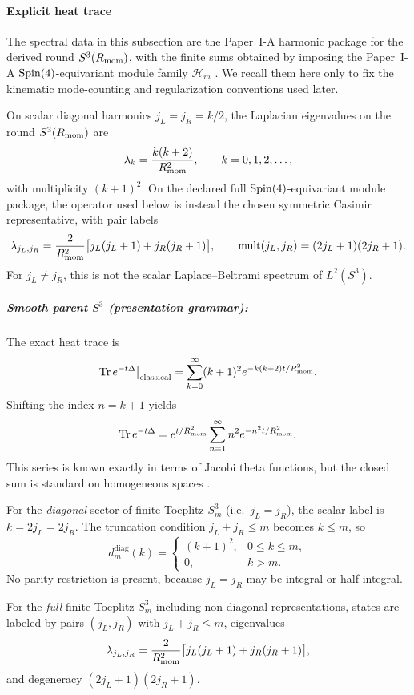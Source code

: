 \documentclass[12pt,a4paper]{article}
\begin{document}
\paragraph{Explicit heat trace}
\label{p2:sec:heat-trace}

The spectral data in this subsection are the Paper~I-A harmonic package for the
derived round \(S^3(R_{\mathrm{mom}})\), with the finite sums obtained by imposing the
Paper~I-A \(\mathrm{Spin}(4)\)-equivariant module family \(\mathcal H_m\)
\cite{Kugelmann2026a}.  We recall them here only to fix the kinematic
mode-counting and regularization conventions used later.

On scalar diagonal harmonics \(j_L=j_R=k/2\), the Laplacian eigenvalues on the round \(S^3(R_{\mathrm{mom}})\) are
\[
\lambda_k=\frac{k(k+2)}{R_{\mathrm{mom}}^2},
\qquad k=0,1,2,\dots,
\]
with multiplicity \((k+1)^2\).  On the declared full
\(\mathrm{Spin}(4)\)-equivariant module package, the operator used below is instead
the chosen symmetric Casimir representative, with pair labels
\[
\lambda_{j_L,j_R}=\frac{2}{R_{\mathrm{mom}}^2}\bigl[j_L(j_L+1)+j_R(j_R+1)\bigr],
\qquad
\mathrm{mult}(j_L,j_R)=(2j_L+1)(2j_R+1).
\]
For \(j_L\ne j_R\), this is not the scalar Laplace--Beltrami spectrum of
\(L^2(S^3)\).

\subparagraph{\texorpdfstring{Smooth parent $S^3$ (presentation grammar):}{Smooth parent S3 (presentation grammar):}}
The exact heat trace is
\[
\mathrm{Tr}\, e^{-t\Delta}\big|_{\text{classical}}
= \sum_{k=0}^{\infty} (k+1)^2 e^{-k(k+2)t/R_{\mathrm{mom}}^2}.
\]
Shifting the index \(n=k+1\) yields
\[
\mathrm{Tr}\, e^{-t\Delta}
= e^{t/R_{\mathrm{mom}}^2} \sum_{n=1}^{\infty} n^2 e^{-n^2 t/R_{\mathrm{mom}}^2}.
\]
This series is known exactly in terms of Jacobi theta functions, but the closed sum is standard on homogeneous spaces \cite{Camporesi1991}.

\begin{definition}\leavevmode\par\noindent
\label{p2:def:truncated-degeneracy-diagonal-sector}
For the \emph{diagonal} sector of finite Toeplitz \(S^3_m\) (i.e.\ \(j_L=j_R\)), the scalar label is \(k=2j_L=2j_R\).  The truncation condition \(j_L+j_R\le m\) becomes \(k\le m\), so
\begin{equation}
d_m^{\mathrm{diag}}(k) =
\begin{cases}
(k+1)^2, & 0\le k\le m,\\
0, & k>m.
\end{cases}
\end{equation}
No parity restriction is present, because \(j_L=j_R\) may be integral or half-integral.

For the \emph{full} finite Toeplitz \(S^3_m\) including non-diagonal representations, states are labeled by pairs \((j_L,j_R)\) with \(j_L+j_R\le m\), eigenvalues
\[
\lambda_{j_L,j_R}=\frac{2}{R_{\mathrm{mom}}^2}\bigl[j_L(j_L+1)+j_R(j_R+1)\bigr],
\]
and degeneracy \((2j_L+1)(2j_R+1)\).
\end{definition}
\end{document}
